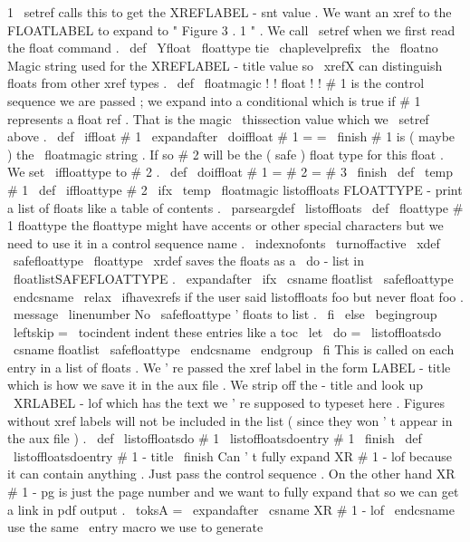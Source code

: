 {{{1
%
}
%
\
setref
calls
this
to
get
the
XREFLABEL
-
snt
value
.
We
want
an
xref
%
to
the
FLOATLABEL
to
expand
to
"
Figure
3
.
1
"
.
We
call
\
setref
when
we
%
first
read
the
float
command
.
%
\
def
\
Yfloat
{
\
floattype
tie
\
chaplevelprefix
\
the
\
floatno
}
%
%
Magic
string
used
for
the
XREFLABEL
-
title
value
so
\
xrefX
can
%
distinguish
floats
from
other
xref
types
.
\
def
\
floatmagic
{
!
!
float
!
!
}
%
#
1
is
the
control
sequence
we
are
passed
;
we
expand
into
a
conditional
%
which
is
true
if
#
1
represents
a
float
ref
.
That
is
the
magic
%
\
thissection
value
which
we
\
setref
above
.
%
\
def
\
iffloat
#
1
{
\
expandafter
\
doiffloat
#
1
=
=
\
finish
}
%
%
#
1
is
(
maybe
)
the
\
floatmagic
string
.
If
so
#
2
will
be
the
%
(
safe
)
float
type
for
this
float
.
We
set
\
iffloattype
to
#
2
.
%
\
def
\
doiffloat
#
1
=
#
2
=
#
3
\
finish
{
%
\
def
\
temp
{
#
1
}
%
\
def
\
iffloattype
{
#
2
}
%
\
ifx
\
temp
\
floatmagic
}
%
listoffloats
FLOATTYPE
-
print
a
list
of
floats
like
a
table
of
contents
.
%
\
parseargdef
\
listoffloats
{
%
\
def
\
floattype
{
#
1
}
%
floattype
{
%
%
the
floattype
might
have
accents
or
other
special
characters
%
but
we
need
to
use
it
in
a
control
sequence
name
.
\
indexnofonts
\
turnoffactive
\
xdef
\
safefloattype
{
\
floattype
}
%
}
%
%
%
\
xrdef
saves
the
floats
as
a
\
do
-
list
in
\
floatlistSAFEFLOATTYPE
.
\
expandafter
\
ifx
\
csname
floatlist
\
safefloattype
\
endcsname
\
relax
\
ifhavexrefs
%
if
the
user
said
listoffloats
foo
but
never
float
foo
.
\
message
{
\
linenumber
No
\
safefloattype
'
floats
to
list
.
}
%
\
fi
\
else
\
begingroup
\
leftskip
=
\
tocindent
%
indent
these
entries
like
a
toc
\
let
\
do
=
\
listoffloatsdo
\
csname
floatlist
\
safefloattype
\
endcsname
\
endgroup
\
fi
}
%
This
is
called
on
each
entry
in
a
list
of
floats
.
We
'
re
passed
the
%
xref
label
in
the
form
LABEL
-
title
which
is
how
we
save
it
in
the
%
aux
file
.
We
strip
off
the
-
title
and
look
up
\
XRLABEL
-
lof
which
%
has
the
text
we
'
re
supposed
to
typeset
here
.
%
%
Figures
without
xref
labels
will
not
be
included
in
the
list
(
since
%
they
won
'
t
appear
in
the
aux
file
)
.
%
\
def
\
listoffloatsdo
#
1
{
\
listoffloatsdoentry
#
1
\
finish
}
\
def
\
listoffloatsdoentry
#
1
-
title
\
finish
{
{
%
%
Can
'
t
fully
expand
XR
#
1
-
lof
because
it
can
contain
anything
.
Just
%
pass
the
control
sequence
.
On
the
other
hand
XR
#
1
-
pg
is
just
the
%
page
number
and
we
want
to
fully
expand
that
so
we
can
get
a
link
%
in
pdf
output
.
\
toksA
=
\
expandafter
{
\
csname
XR
#
1
-
lof
\
endcsname
}
%
%
%
use
the
same
\
entry
macro
we
use
to
generate
}}}}
